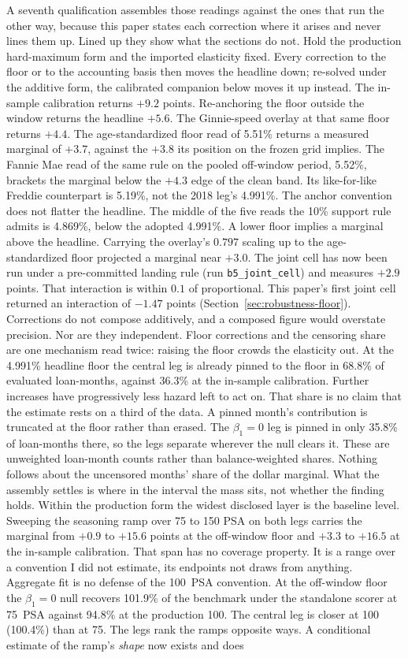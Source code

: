 \documentclass[12pt]{article}
\begin{document}
A seventh qualification assembles those readings against the ones that run the other way, because this paper states each correction where it arises and never lines them up. Lined up they show what the sections do not. Hold the production hard-maximum form and the imported elasticity fixed. Every correction to the floor or to the accounting basis then moves the headline down; re-solved under the additive form, the calibrated companion below moves it up instead. The in-sample calibration returns $+9.2$ points. Re-anchoring the floor outside the window returns the headline $+5.6$. The Ginnie-speed overlay at that same floor returns $+4.4$. The age-standardized floor read of 5.51\% returns a measured marginal of $+3.7$, against the $+3.8$ its position on the frozen grid implies. The Fannie Mae read of the same rule on the pooled off-window period, 5.52\%, brackets the marginal below the $+4.3$ edge of the clean band. Its like-for-like Freddie counterpart is 5.19\%, not the 2018 leg's 4.991\%. The anchor convention does not flatter the headline. The middle of the five reads the 10\% support rule admits is 4.869\%, below the adopted 4.991\%. A lower floor implies a marginal above the headline. Carrying the overlay's $0.797$ scaling up to the age-standardized floor projected a marginal near $+3.0$. The joint cell has now been run under a pre-committed landing rule (run \texttt{b5\_joint\_cell}) and measures $+2.9$ points. That interaction is within $0.1$ of proportional. This paper's first joint cell returned an interaction of $-1.47$ points (Section~\ref{sec:robustness-floor}). Corrections do not compose additively, and a composed figure would overstate precision. Nor are they independent. Floor corrections and the censoring share are one mechanism read twice: raising the floor crowds the elasticity out. At the 4.991\% headline floor the central leg is already pinned to the floor in 68.8\% of evaluated loan-months, against 36.3\% at the in-sample calibration. Further increases have progressively less hazard left to act on. That share is no claim that the estimate rests on a third of the data. A pinned month's contribution is truncated at the floor rather than erased. The $\beta_1 = 0$ leg is pinned in only 35.8\% of loan-months there, so the legs separate wherever the null clears it. These are unweighted loan-month counts rather than balance-weighted shares. Nothing follows about the uncensored months' share of the dollar marginal. What the assembly settles is where in the interval the mass sits, not whether the finding holds. Within the production form the widest disclosed layer is the baseline level. Sweeping the seasoning ramp over 75 to 150 PSA on both legs carries the marginal from $+0.9$ to $+15.6$ points at the off-window floor and $+3.3$ to $+16.5$ at the in-sample calibration. That span has no coverage property. It is a range over a convention I did not estimate, its endpoints not draws from anything. Aggregate fit is no defense of the 100~PSA convention. At the off-window floor the $\beta_1 = 0$ null recovers 101.9\% of the benchmark under the standalone scorer at 75~PSA against 94.8\% at the production 100. The central leg is closer at 100 (100.4\%) than at 75. The legs rank the ramps opposite ways. A conditional estimate of the ramp's \emph{shape} now exists and does 
\end{document}
